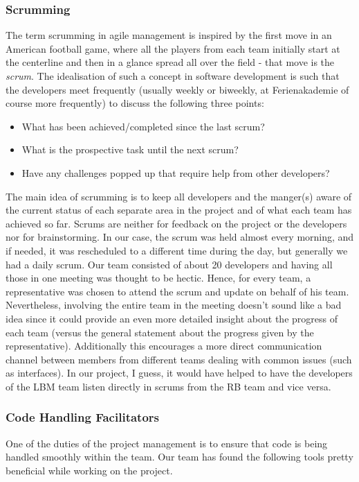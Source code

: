 \subsubsection{Scrumming}
The term scrumming in agile management is inspired by the first move in an American football game, where all the players from each team initially start at the centerline and then in a glance spread all over the field - that move is the \emph{scrum}. The idealisation of such a concept in software development is such that the developers meet frequently (usually weekly or biweekly, at Ferienakademie of course more frequently) to discuss the following three points:
\begin{itemize}
  \item{What has been achieved/completed since the last scrum?}
  \item{What is the prospective task until the next scrum?}
  \item{Have any challenges popped up that require help from other developers?}
\end{itemize}
The main idea of scrumming is to keep all developers and the manger(s) aware of the current status of each separate area in the project and of what each team has achieved so far. 
Scrums are neither for feedback on the project or the developers nor for brainstorming. 
In our case, the scrum was held almost every morning, and if needed, it was rescheduled to a different time during the day, but generally we had a daily scrum. Our team consisted of about 20 developers and having all those in one meeting was thought to be hectic. Hence, for every team, a representative was chosen to attend the scrum and update on behalf of his team. Nevertheless, involving the entire team in the meeting doesn't sound like a bad idea since it could provide an even more detailed insight about the progress of each team (versus the general statement about the progress given by the representative). Additionally this encourages a more direct communication channel between members from different teams dealing with common issues (such as interfaces).  In our project, I guess, it would have helped to have the developers of the LBM team listen directly in scrums from the RB team and vice versa.

\subsubsection{Code Handling Facilitators}
One of the duties of the project management is to ensure that code is being handled smoothly within the team. Our team has found the following tools pretty beneficial while working on the project.

